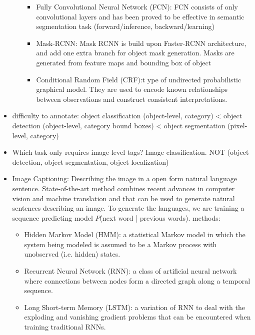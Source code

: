 \documentclass[10pt]{article}
\begin{document}
\begin{itemize}[label=\(\star\), leftmargin=1em, itemsep=-0.3em]
\begin{itemize}[label=\(\star\), leftmargin=1em, itemsep=-0.3em]
                    \begin{itemize}[label=\(\star\), leftmargin=1em, itemsep=-0.3em]
                        \item Fully Convolutional Neural Network (FCN):  FCN consists of only convolutional layers and has been proved to be
                              effective in semantic segmentation task  (forward/inference, backward/learning)
                        \item Mask-RCNN:  Mask RCNN is build upon Faster-RCNN architecture, and add one extra branch for object mask generation. Masks are generated from feature maps and bounding box of object
                        \item Conditional Random Field (CRF):t ype of undirected probabilistic graphical model. They are used to encode known relationships between observations and construct consistent interpretations.
                    \end{itemize}
          \end{itemize}

    \item difficulty to annotate: object classification (object-level, category) < object detection (object-level, category bound boxes) < object segmentation (pixel-level, category)

    \item Which task only requires image-level tags? Image classification. NOT  (object detection,  object segmentation,  object localization)

    \item Image Captioning: Describing the image in a open form natural language sentence. State-of-the-art method combines recent advances in computer vision and machine translation and that can be used to generate natural sentences describing an image. To generate the languages, we are training a sequence predicting model  $P$(next word | previous words). methods:
          \begin{itemize}[label=\(\star\), leftmargin=1em, itemsep=-0.3em]
              \item Hidden Markov Model (HMM):  a statistical Markov model in which the system being modeled is assumed to be a Markov process with unobserved (i.e. hidden) states.
              \item Recurrent Neural Network (RNN): a class of artificial neural network where connections between nodes form a directed graph along a temporal sequence.
              \item Long Short-term Memory (LSTM): a variation of RNN to deal with the exploding and vanishing gradient problems that can be encountered when training traditional RNNs.
          \end{itemize}


\end{itemize}
\end{document}
